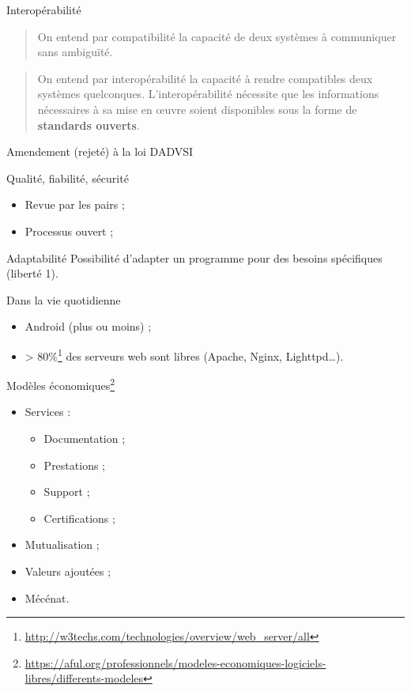 \begin{frame}{Interopérabilité}
  \begin{quote}\small
    On entend par compatibilité la capacité de deux systèmes à communiquer sans ambiguïté.
  \end{quote}
  \begin{quote}\small
    On entend par interopérabilité la capacité à rendre compatibles deux systèmes quelconques. L'interopérabilité nécessite que les informations nécessaires à sa mise en œuvre soient disponibles sous la forme de \textbf{standards ouverts}.
  \end{quote}
  \begin{flushright}
    Amendement (rejeté) à la loi DADVSI
  \end{flushright}
\end{frame}

\begin{frame}{Qualité, fiabilité, sécurité}
  \begin{itemize}
    \item Revue par les pairs ;
    \item Processus ouvert ;
  \end{itemize}
  
\end{frame}

\begin{frame}{Adaptabilité}
  Possibilité d'adapter un programme pour des besoins spécifiques (liberté 1).
\end{frame}

\begin{frame}{Dans la vie quotidienne}
  \begin{itemize}
    \item Android (plus ou moins) ;
    \item > 80\%\footnote{\tiny\url{http://w3techs.com/technologies/overview/web_server/all}} des serveurs web sont libres (Apache, Nginx, Lighttpd\dots).
  \end{itemize}
\end{frame}

\begin{frame}{Modèles économiques\footnote{\tiny\url{https://aful.org/professionnels/modeles-economiques-logiciels-libres/differents-modeles}}}
  \begin{itemize}
    \item Services :
    \begin{itemize}
      \item Documentation ;
      \item Prestations ;
      \item Support ;
      \item Certifications ;
    \end{itemize}
    \item Mutualisation ;
    \item Valeurs ajoutées ;
    \item Mécénat.
  \end{itemize}
\end{frame}

